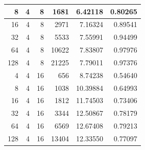 \documentclass[journal,transmag]{IEEEtran}
\begin{document}
\begin{table}[h]
\begin{tabular}{|r|r|r|r|r|r|}
		8                             & 4                          & 8                                & 1681                           & 6.42118                       & 0.80265                         \\ \hline
		16                            & 4                          & 8                                & 2971                           & 7.16324                       & 0.89541                         \\ \hline
		32                            & 4                          & 8                                & 5533                           & 7.55991                       & 0.94499                         \\ \hline
		64                            & 4                          & 8                                & 10622                          & 7.83807                       & 0.97976                         \\ \hline
		128                           & 4                          & 8                                & 21225                          & 7.79011                       & 0.97376                         \\ \hline
		4                             & 4                          & 16                               & 656                            & 8.74238                       & 0.54640                         \\ \hline
		8                             & 4                          & 16                               & 1038                           & 10.39884                      & 0.64993                         \\ \hline
		16                            & 4                          & 16                               & 1812                           & 11.74503                      & 0.73406                         \\ \hline
		32                            & 4                          & 16                               & 3344                           & 12.50867                      & 0.78179                         \\ \hline
		64                            & 4                          & 16                               & 6569                           & 12.67408                      & 0.79213                         \\ \hline
		128                           & 4                          & 16                               & 13404                          & 12.33550                      & 0.77097                         \\ \hline

\end{tabular}
\end{table}
\end{document}
